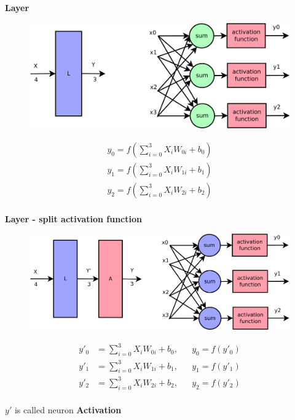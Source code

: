 \documentclass[xcolor=dvipsnames]{beamer}
\begin{document}
\begin{frame}{\bf Layer}

\begin{figure}
  \includegraphics[scale=0.2]{../../diagrams/nn/nn_layer.png}
\end{figure}

\begin{align*}
    y_0 = f(\sum_{i=0}^{3} X_iW_{0i} + b_0) \\
    y_1 = f(\sum_{i=0}^{3} X_iW_{1i} + b_1) \\
    y_2 = f(\sum_{i=0}^{3} X_iW_{2i} + b_2) \\
\end{align*}

\end{frame}


\begin{frame}{\bf Layer - split activation function}

\begin{figure}
  \includegraphics[scale=0.2]{../../diagrams/nn/nn_layer_split.png}
\end{figure}

\begin{align*}
    y'_0&= \sum_{i=0}^{3} X_iW_{0i} + b_0, &&y_0 = f(y'_0)\\
    y'_1&= \sum_{i=0}^{3} X_iW_{1i} + b_1, &&y_1 = f(y'_1)\\
    y'_2&= \sum_{i=0}^{3} X_iW_{2i} + b_2, &&y_2 = f(y'_2)\\
\end{align*}

$y'$ is called neuron {\bf \color{red} Activation}

\end{frame}
\end{document}
